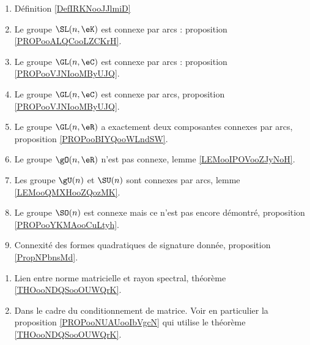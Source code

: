     \begin{enumerate}
        \item
            Définition \ref{DefIRKNooJJlmiD}
        \item
            Le groupe \( \SL(n,\eK)\) est connexe par arcs : proposition \ref{PROPooALQCooLZCKrH}.
        \item
            Le groupe \( \GL(n,\eC)\) est connexe par arcs : proposition \ref{PROPooVJNIooMByUJQ}.
        \item
            Le groupe \( \GL(n,\eC)\) est connexe par arcs, proposition \ref{PROPooVJNIooMByUJQ}.
        \item
            Le groupe \( \GL(n,\eR)\) a exactement deux composantes connexes par arcs, proposition \ref{PROPooBIYQooWLndSW}.
        \item
            Le groupe \( \gO(n,\eR)\) n'est pas connexe, lemme \ref{LEMooIPOVooZJyNoH}.
        \item
            Les groupe \( \gU(n)\) et \( \SU(n)\) sont connexes par arcs, lemme \ref{LEMooQMXHooZQozMK}.
        \item
            Le groupe \( \SO(n)\) est connexe mais ce n'est pas encore démontré, proposition \ref{PROPooYKMAooCuLtyh}.
        \item 
            Connexité des formes quadratiques de signature donnée, proposition \ref{PropNPbnsMd}.
        \end{enumerate}

    \begin{enumerate}
        \item
            Lien entre norme matricielle et rayon spectral, théorème \ref{THOooNDQSooOUWQrK}.
        \item
            Dans le cadre du conditionnement de matrice. Voir en particulier la proposition \ref{PROPooNUAUooIbVgcN} qui utilise le théorème \ref{THOooNDQSooOUWQrK}.
        \end{enumerate}

